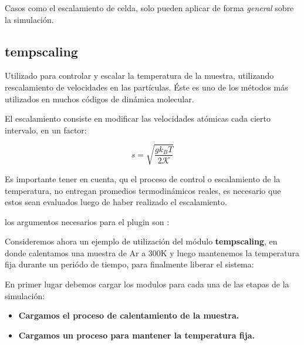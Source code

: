 Casos como el escalamiento de celda, solo pueden aplicar de forma \textit{general} sobre la simulaci\'on.

\subsection{tempscaling}

Utilizado para controlar y escalar la temperatura de la muestra, utilizando rescalamiento de velocidades en las part\'iculas. \'Este es uno de los m\'etodos m\'as utilizados en muchos c\'odigos de din\'amica molecular.

El escalamiento consiste en modificar las velocidades at\'omicas cada cierto intervalo, en un factor:

$$s=\sqrt{\frac{gk_BT}{2\mathcal{K}}}$$

Es importante tener en cuenta, qu el proceso de control o escalamiento de la temperatura, no entregan promedios termodin\'amicos reales, es necesario que estos sean evaluados luego de haber realizado el escalamiento.

los argumentos necesarios para el plugin son :


Consideremos ahora un ejemplo de utilizaci\'on del m\'odulo \textbf{tempscaling}, en donde calentamos una muestra de Ar a 300K y luego mantenemos la temperatura fija durante un peri\'odo de tiempo, para finalmente liberar el sistema:

En primer lugar debemos cargar los modulos para cada una de las etapas de la simulaci\'on:

\begin{itemize}
 \item \textbf{Cargamos el proceso de calentamiento de la muestra.}
 \item \textbf{Cargamos un proceso para mantener la temperatura fija.}
\end{itemize}

